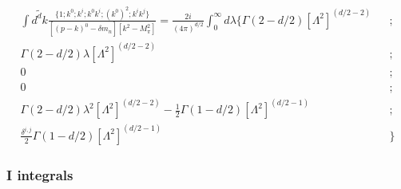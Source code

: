 \documentclass{article}
\newcommand{\bea}{\begin{eqnarray}}
\newcommand{\eea}{\end{eqnarray}}
\begin{document}
\bea
\int \tilde{d^dk} \frac{   \{ 1 ; k^0 ; k^i ; k^0k^i ; (k^0)^2 ; k^ik^j  \}    }{ \left[ \left(p-k\right)^0 -\delta m_n \right] \left[k^2-M_\pi^2 \right] } 
=\frac{2i}{ \left( 4\pi \right)^{d/2} }  \int_{0}^{\infty}d\lambda      \{ \Gamma \left( 2-d/2 \right) \left[ \Lambda^2 \right]^{(d/2-2)}&&;
\nonumber  \\
\Gamma \left( 2-d/2 \right)\lambda\left[ \Lambda^2 \right]^{(d/2-2)}&&;
\nonumber  \\
0  && ;
\nonumber  \\
0  &&;
\nonumber  \\
\Gamma \left( 2-d/2 \right)\lambda^2 \left[ \Lambda^2 \right]^{(d/2-2)} - \frac{1}{2} \Gamma \left( 1-d/2 \right) \left[ \Lambda^2 \right]^{(d/2-1)} && ;
\nonumber  \\
\frac{\delta^{i,j}}{2} \Gamma \left(1-d/2 \right) \left[ \Lambda^2 \right]^{(d/2-1)} && \}
\nonumber
\eea


\newpage
\subsubsection{I integrals}
\end{document}
